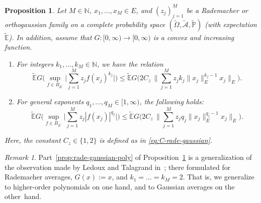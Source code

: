\documentclass[reqno]{amsart}
\numberwithin{equation}{section}
\newcommand{\bbE}{\mathbb{E}}
\newcommand{\bbN}{\mathbb{N}}
\newcommand{\bbP}{\mathbb{P}}
\newcommand{\cA}{\mathcal{A}}
\newcommand{\Omegat}{\widetilde{\Omega}}
\newcommand{\cAt}{\widetilde{\cA}}
\newcommand{\bbPt}{\widetilde{\bbP}}
\newcommand{\bbEt}{\widetilde{\bbE}}
\newcommand{\norm}[2]{     \| #1       \|_{ #2 }}
\newcommand{\dual}[1]{{#1}^{\prime}}
\newcommand{\from}{\colon}
\newtheorem{proposition}[lemma]{Proposition}
\theoremstyle{remark}
\newtheorem{remark}[lemma]{Remark}
\theoremstyle{definition}
\begin{document}
\begin{proposition}\label{prop:rade-gaussian}  
	Let $M\in\bbN$, 
	$x_1,\ldots,x_M\in E$, 
	and $(z_j)_{j=1}^M$ be 
	a Rademacher or 
	orthogaussian family 
	on a complete probability space 
	$(\Omegat,\cAt,\bbPt)$ 
	(with expectation $\bbEt$). 
	In addition, assume that 
	$G\from [0,\infty) \to [0,\infty)$ 
	is a convex and increasing function. 
	\begin{enumerate}[leftmargin=1cm] 
		\item\label{prop:rade-gaussian-poly}  
		For integers $k_1, \ldots, k_M\in\bbN$,  
		we have the relation  
		\begin{equation}\label{eq:prop:rade-gaussian-poly} 
		\bbEt 
		G\Biggl( 
		\sup_{f\in B_{\dual{E}}}  
		\biggl| 
		\sum_{j=1}^M 
		z_j f(x_j)^{k_j} \biggr| 
		\Biggr) 
		\leq 
		\bbEt 
		G\Biggl(  
		2 C_z \, 
		\biggl\| 
		\sum_{j=1}^M 
		z_j k_j \norm{x_j}{E}^{k_j-1} x_j \biggr\|_E 
		\Biggr).  
		\end{equation}
		\item\label{prop:rade-gaussian-q}   
		For general exponents 
		$q_1,\ldots,q_M\in[1,\infty)$,  
		the following holds: 
		\begin{equation}\label{eq:prop:rade-gaussian-q} 
		\bbEt 
		G\Biggl(  
		\sup_{f\in B_{\dual{E}}}  
		\biggl| 
		\sum_{j=1}^M 
		z_j |f(x_j)|^{q_j} \biggr| 
		\Biggr) 
		\leq 
		\bbEt 
		G\Biggl(  
		2 C_z \, 
		\biggl\| 
		\sum_{j=1}^M 
		z_j q_j \norm{x_j}{E}^{q_j-1}  x_j \biggr\|_E 
		\Biggr). 
		\end{equation} 
	\end{enumerate}
	Here, the constant $C_z\in\{1,2\}$ is defined 
	as in \eqref{eq:C-rade-gaussian}. 
\end{proposition} 

\begin{remark} 
	Part~\ref{prop:rade-gaussian-poly} of Proposition~\ref{prop:rade-gaussian} 
	is a generalization  
	of the observation 
	made by Ledoux and Talagrand 
	in~\cite[Equation~(4.19)]{LedouxTalagrand2011}; 
	there formulated for 
	Rademacher averages, 
	$G(x):=x$, and 
	$k_1=\ldots=k_M=2$. 
	That is, we generalize to  
	higher-order polynomials on one hand, 
	and to Gaussian averages on the other~hand. 
\end{remark} 
\end{document}
